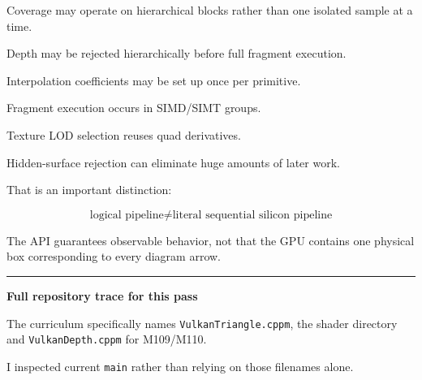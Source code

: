 Coverage may operate on hierarchical blocks rather than one isolated sample at a time.

Depth may be rejected hierarchically before full fragment execution.

Interpolation coefficients may be set up once per primitive.

Fragment execution occurs in SIMD/SIMT groups.

Texture LOD selection reuses quad derivatives.

Hidden-surface rejection can eliminate huge amounts of later work.

That is an important distinction:

\[
\boxed{
\text{logical pipeline}
\neq
\text{literal sequential silicon pipeline}
}
\]

The API guarantees observable behavior, not that the GPU contains one physical box corresponding to every diagram arrow.

\begin{center}\rule{0.5\linewidth}{0.5pt}\end{center}

\textbf{Full repository trace for this pass}

The curriculum specifically names \texttt{VulkanTriangle.cppm}, the shader directory and \texttt{VulkanDepth.cppm} for M109/M110.

I inspected current \texttt{main} rather than relying on those filenames alone.

